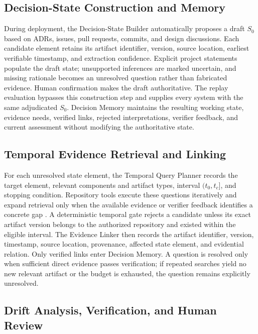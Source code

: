 \documentclass[10pt,conference]{IEEEtran}
\begin{document}
\subsection{Decision-State Construction and Memory}
\label{sec:decision-state-memory}

During deployment, the Decision-State Builder automatically proposes a draft $S_0$ based on ADRs, issues, pull requests, commits, and design discussions. Each candidate element retains its artifact identifier, version, source location, earliest verifiable timestamp, and extraction confidence. Explicit project statements populate the draft state; unsupported inferences are marked uncertain, and missing rationale becomes an unresolved question rather than fabricated evidence. Human confirmation makes the draft authoritative. The replay evaluation bypasses this construction step and supplies every system with the same adjudicated $S_0$. Decision Memory maintains the resulting working state, evidence needs, verified links, rejected interpretations, verifier feedback, and current assessment without modifying the authoritative state.

\subsection{Temporal Evidence Retrieval and Linking}
\label{sec:temporal-retrieval}

For each unresolved state element, the Temporal Query Planner records the target element, relevant components and artifact types, interval $(t_0,t_c]$, and stopping condition. Repository tools execute these questions iteratively and expand retrieval only when the available evidence or verifier feedback identifies a concrete gap \cite{Akhavan2026LinkAnchor,Zhang2023RepoCoder,Ke2026RAG}. A deterministic temporal gate rejects a candidate unless its exact artifact version belongs to the authorized repository and existed within the eligible interval. The Evidence Linker then records the artifact identifier, version, timestamp, source location, provenance, affected state element, and evidential relation. Only verified links enter Decision Memory. A question is resolved only when sufficient direct evidence passes verification; if repeated searches yield no new relevant artifact or the budget is exhausted, the question remains explicitly unresolved.

\subsection{Drift Analysis, Verification, and Human Review}
\label{sec:drift-verification}
\end{document}
